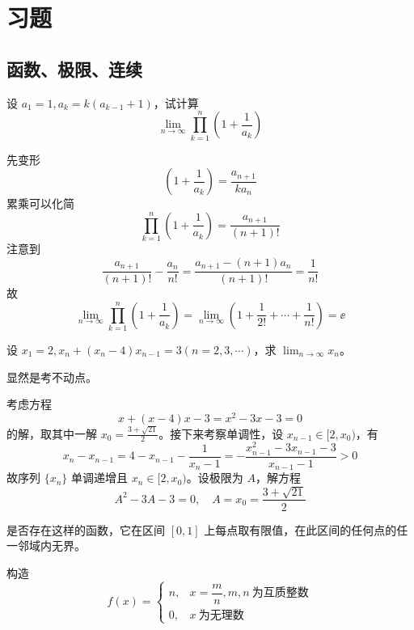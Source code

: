 \chapter{习题}

\section{函数、极限、连续}

\begin{problem}[000001]
设 $a_1=1,a_k=k(a_{k-1}+1)$，试计算
\[ \lim_{n\to \infty}\prod_{k=1}^n\left(1+\frac{1}{a_k}\right)\]
\end{problem}
\begin{solution}
	先变形
	\[ \left(1+\frac{1}{a_k}\right)=\frac{a_{n+1}}{ka_n}\]
	累乘可以化简
	\[ \prod_{k=1}^n\left(1+\frac{1}{a_k}\right) = \frac{a_{n+1}}{(n+1)!}\]
	注意到
	\[ \frac{a_{n+1}}{(n+1)!}-\frac{a_{n}}{n!} = \frac{a_{n+1}-(n+1)a_n}{(n+1)!} = \frac{1}{n!}\]
	故
	\[ \lim_{n\to \infty}\prod_{k=1}^n\left(1+\frac{1}{a_k}\right) = \lim_{n\to \infty}\left(1+\frac{1}{2!}+\cdots+\frac{1}{n!}\right) = \ee\]
\end{solution}

\begin{problem}[000002]
设 $x_1 = 2, x_n + (x_n - 4)x_{n-1} = 3(n = 2, 3, \cdots)$，求 $\displaystyle\lim_{n\to \infty} x_n$。
\end{problem}

\begin{solution}
	显然是考不动点。

	考虑方程
	\[ x + (x-4)x - 3 = x^2 - 3x - 3 = 0 \]
	的解，取其中一解 $x_0 = \frac{3 + \sqrt{21}}{2}$。接下来考察单调性，设 $x_{n-1} \in [2, x_0)$，有
	\[ x_n - x_{n-1} = 4 - x_{n-1} - \frac{1}{x_n - 1} = -\frac{x_{n-1}^2 - 3x_{n-1} - 3}{x_{n-1} - 1} > 0 \]
	故序列 $\{x_n\}$ 单调递增且 $x_n \in [2, x_0)$。设极限为 $A$，解方程
	\[ A^2 - 3A - 3 = 0, \quad A = x_0 = \frac{3 + \sqrt{21}}{2} \]
\end{solution}

\begin{problem}[000003]
是否存在这样的函数，它在区间 $[0,1]$ 上每点取有限值，在此区间的任何点的任一邻域内无界。
\end{problem}
\begin{solution}
	构造
	\[ f(x) = \begin{cases}
			n, & x=\dfrac{m}{n},m,n\ \text{为互质整数} \\
			0, & x\ \text{为无理数}
		\end{cases} \]
\end{solution}

